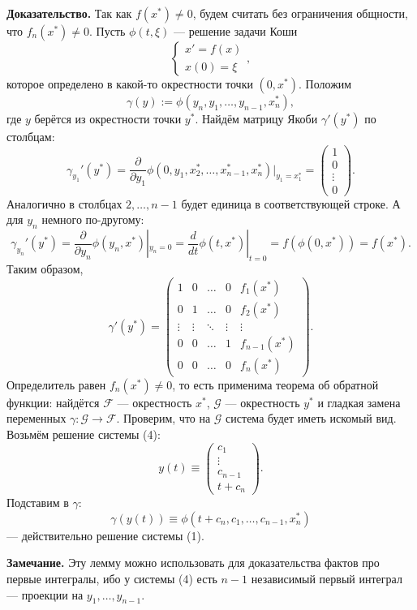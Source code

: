 \textbf{Доказательство.} Так как $f(x^*) \ne 0$, будем считать без ограничения общности, что $f_n(x^*) \ne 0$.
Пусть $\phi(t, \xi)$ --- решение задачи Коши
\[
    \begin{cases}
        x' = f(x) \\
        x(0) = \xi
    \end{cases},
\]
которое определено в какой-то окрестности точки $(0, x^*)$.
Положим
\[
    \gamma(y) := \phi(y_n, y_1, \dots, y_{n-1}, x_n^*),
\]
где $y$ берётся из окрестности точки $y^*$.
Найдём матрицу Якоби $\gamma'(y^*)$ по столбцам:
\[
    \gamma_{y_1}'(y^*) = \frac{\partial}{\partial y_1} \phi(0, y_1, x_2^*, \dots, x_{n-1}^*, x_n^*)|_{y_1 = x_1^*} =
    \begin{pmatrix}
        1 \\
        0 \\
        \vdots \\
        0
    \end{pmatrix}.
\]
Аналогично в столбцах $2, \dots, n - 1$ будет единица в соответствующей строке.
А для $y_n$ немного по-другому:
\[
    \gamma_{y_n}'(y^*) = \frac{\partial}{\partial y_n} \phi(y_n, x^*)|_{y_n = 0} = \frac{d}{dt} \phi(t, x^*)|_{t = 0} = f(\phi(0, x^*)) = f(x^*).
\]
Таким образом,
\[
    \gamma'(y^*) =
    \begin{pmatrix}
        1 & 0 & \dots & 0 & f_1(x^*) \\
        0 & 1 & \dots & 0 & f_2(x^*) \\
        \vdots & \vdots & \ddots & \vdots & \vdots \\
        0 & 0 & \dots & 1 & f_{n-1}(x^*) \\
        0 & 0 & \dots & 0 & f_n(x^*)
    \end{pmatrix}.
\]
Определитель равен $f_n(x^*) \ne 0$, то есть применима теорема об обратной функции: найдётся $\mathcal F$ --- окрестность $x^*$, $\mathcal G$ --- окрестность $y^*$ и гладкая замена переменных $\gamma: \mathcal G \to \mathcal F$.
Проверим, что на $\mathcal G$ система будет иметь искомый вид.
Возьмём решение системы (4):
\[
    y(t) \equiv
    \begin{pmatrix}
        c_1 \\
        \vdots \\
        c_{n-1} \\
        t + c_n
    \end{pmatrix}.
\]
Подставим в $\gamma$:
\[
    \gamma(y(t)) \equiv \phi(t + c_n, c_1, \dots, c_{n-1}, x_n^*)
\]
--- действительно решение системы (1).

\QED

\textbf{Замечание.} Эту лемму можно использовать для доказательства фактов про первые интегралы, ибо у системы (4) есть $n - 1$ независимый первый интеграл --- проекции на $y_1, \dots, y_{n-1}$.

